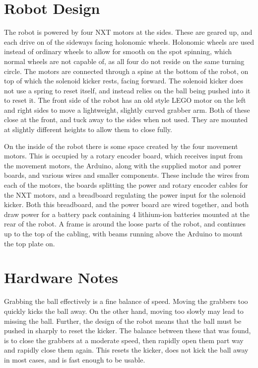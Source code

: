 \section{Robot Design}

The robot is powered by four NXT motors at the sides. These are geared up, and
each drive on of the sideways facing holonomic wheels. Holonomic wheels are
used instead of ordinary wheels to allow for smooth on the spot spinning, which
normal wheels are not capable of, as all four do not reside on the same turning
circle. The motors are connected through a spine at the bottom of the robot,
on top of which the solenoid kicker rests, facing forward. The solenoid kicker
does not use a spring to reset itself, and instead relies on the ball being
pushed into it to reset it. The front side of the robot has an old style LEGO
motor on the left and right sides to move a lightweight, slightly curved
grabber arm. Both of these close at the front, and tuck away to the sides when
not used. They are mounted at slightly different heights to allow them to close
fully.

On the inside of the robot there is some space created by the four movement
motors. This is occupied by a rotary encoder board, which receives input from
the movement motors, the Arduino, along with the supplied motor and power
boards, and various wires and smaller components. These include the wires from
each of the motors, the boards splitting the power and rotary encoder cables
for the NXT motors, and a breadboard regulating the power input for the
solenoid kicker. Both this breadboard, and the power board are wired together,
and both draw power for a battery pack containing 4 lithium-ion batteries
mounted at the rear of the robot. A frame is around the loose parts of the
robot, and continues up to the top of the cabling, with beams running above the
Arduino to mount the top plate on.

\section{Hardware Notes}

Grabbing the ball effectively is a fine balance of speed. Moving the grabbers
too quickly kicks the ball away. On the other hand, moving too slowly may lead
to missing the ball. Further, the design of the robot means that the ball must
be pushed in sharply to reset the kicker. The balance between these that was
found, is to close the grabbers at a moderate speed, then rapidly open them
part way and rapidly close them again. This resets the kicker, does not kick
the ball away in most cases, and is fast enough to be usable.

